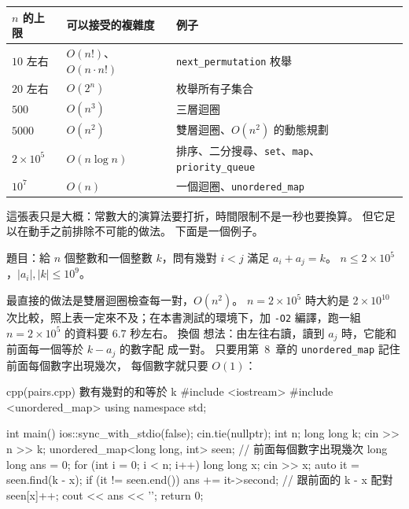 \begin{center}
\begin{tabular}{lll}
\toprule
$n$ 的上限 & 可以接受的複雜度 & 例子 \\
\midrule
$10$ 左右 & $O(n!)$、$O(n \cdot n!)$ & \texttt{next\_permutation} 枚舉 \\
$20$ 左右 & $O(2^n)$ & 枚舉所有子集合 \\
$500$ & $O(n^3)$ & 三層迴圈 \\
$5000$ & $O(n^2)$ & 雙層迴圈、$O(n^2)$ 的動態規劃 \\
$2 \times 10^5$ & $O(n \log n)$ & 排序、二分搜尋、\texttt{set}、\texttt{map}、\texttt{priority\_queue} \\
$10^7$ & $O(n)$ & 一個迴圈、\texttt{unordered\_map} \\
\bottomrule
\end{tabular}
\end{center}

這張表只是大概：常數大的演算法要打折，時間限制不是一秒也要換算。 但它足
以在動手之前排除不可能的做法。 下面是一個例子。

題目：給 $n$ 個整數和一個整數 $k$，問有幾對 $i < j$ 滿足
$a_i + a_j = k$。 $n \le 2 \times 10^5$，$|a_i|, |k| \le 10^9$。

最直接的做法是雙層迴圈檢查每一對，$O(n^2)$。 $n = 2 \times 10^5$ 時大約是
$2 \times 10^{10}$ 次比較，照上表一定來不及；在本書測試的環境下，加
\texttt{-O2} 編譯，跑一組 $n = 2 \times 10^5$ 的資料要 $6.7$ 秒左右。 換個
想法：由左往右讀，讀到 $a_j$ 時，它能和前面每一個等於 $k - a_j$ 的數字配
成一對。 只要用第~8~章的 \texttt{unordered\_map} 記住前面每個數字出現幾次，
每個數字就只要 $O(1)$：

\begin{example}[label=ex:pairs]{cpp}{(pairs.cpp) 數有幾對的和等於 k}
#include <iostream>
#include <unordered_map>
using namespace std;

int main() {
    ios::sync_with_stdio(false);
    cin.tie(nullptr);
    int n;
    long long k;
    cin >> n >> k;
    unordered_map<long long, int> seen;   // 前面每個數字出現幾次
    long long ans = 0;
    for (int i = 0; i < n; i++) {
        long long x;
        cin >> x;
        auto it = seen.find(k - x);
        if (it != seen.end()) {
            ans += it->second;            // 跟前面的 k - x 配對
        }
        seen[x]++;
    }
    cout << ans << '\n';
    return 0;
}
\end{example}



